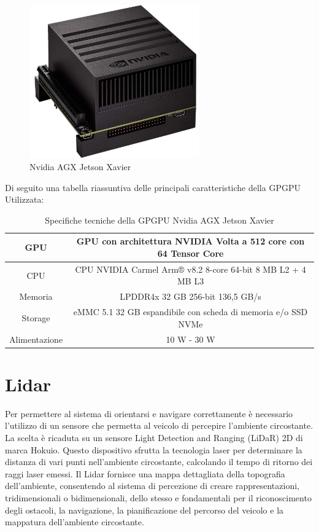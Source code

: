 \begin{figure}[h]
  \centering
  \includegraphics[width=0.65\textwidth]{figures/xavier.jpg}
  \caption{Nvidia AGX Jetson Xavier}
  \label{Nvidia AGX Jetson Xavier}
\end{figure}

\noindent Di seguito una tabella riassuntiva delle principali caratteristiche della GPGPU Utilizzata:

\begin{center}
  \begin{table}[h]
  \centering
    \begin{tabular}{|c|c|}
      \hline 
      GPU& GPU con architettura NVIDIA Volta a 512 core con 64 Tensor Core \\
      \hline 
      CPU& CPU NVIDIA Carmel Arm® v8.2 8-core 64-bit 8 MB L2 + 4 MB L3 \\
      \hline 
      Memoria& LPDDR4x 32 GB 256-bit 136,5 GB/s \\
      \hline
      Storage& eMMC 5.1 32 GB espandibile con scheda di memoria e/o SSD NVMe \\ 
      \hline
      Alimentazione& 10 W - 30 W \\
      \hline
    \end{tabular}
    \caption{Specifiche tecniche della GPGPU Nvidia AGX Jetson Xavier\cite{jetson_xavier}}
  \end{table}
\end{center}

\section{Lidar}
Per permettere al sistema di orientarsi e navigare correttamente è necessario l'utilizzo di un sensore che permetta al veicolo di percepire l'ambiente circostante. La scelta è ricaduta su un sensore Light Detection and Ranging (LiDaR) 2D di marca Hokuio. Questo dispositivo sfrutta la tecnologia laser per determinare la distanza di vari punti nell'ambiente circostante, calcolando il tempo di ritorno dei raggi laser emessi. Il Lidar fornisce una mappa dettagliata della topografia dell'ambiente, consentendo al sistema di percezione di creare rappresentazioni, tridimensionali o bidimensionali, dello stesso e fondamentali per il riconoscimento degli ostacoli, la navigazione, la pianificazione del percorso del veicolo e la mappatura dell'ambiente circostante.

